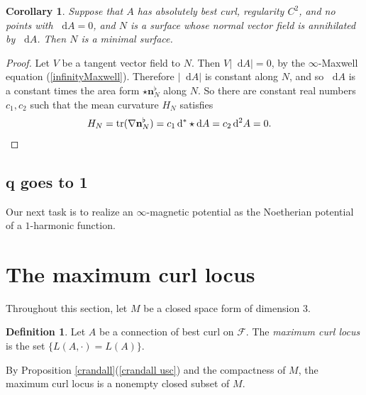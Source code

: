 \documentclass[reqno,11pt]{amsart}
\newcommand*\dif{\mathop{}\!\mathrm{d}}
\DeclareMathOperator{\tr}{tr}
\newcommand{\normal}{\mathbf n}
\newcommand{\dfn}[1]{\emph{#1}\index{#1}}
\newtheorem{corollary}[theorem]{Corollary}
\theoremstyle{definition}
\newtheorem{definition}[theorem]{Definition}
\numberwithin{equation}{section}
\begin{document}
\begin{corollary}
Suppose that $A$ has absolutely best curl, regularity $C^2$, and no points with $\dif A = 0$, and $N$ is a surface whose normal vector field is annihilated by $\dif A$.
Then $N$ is a minimal surface.
\end{corollary}
\begin{proof}
Let $V$ be a tangent vector field to $N$. Then $V|\dif A| = 0$, by the $\infty$-Maxwell equation (\ref{infinityMaxwell}).
Therefore $|\dif A|$ is constant along $N$, and so $\dif A$ is a constant times the area form $\star \normal_N^\flat$ along $N$.
So there are constant real numbers $c_1, c_2$ such that the mean curvature $H_N$ satisfies
\begin{align*}
H_N &= \tr(\nabla \normal_N^\flat) = c_1 \dif^* \star \dif A = c_2 \dif^2 A = 0. \qedhere
\end{align*}
\end{proof}


\subsection{q goes to 1}
Our next task is to realize an $\infty$-magnetic potential as the Noetherian potential of a $1$-harmonic function.



\section{The maximum curl locus}
Throughout this section, let $M$ be a closed space form of dimension $3$.

\begin{definition}
Let $A$ be a connection of best curl on $\mathscr F$.
The \dfn{maximum curl locus} is the set $\{L(A, \cdot) = L(A)\}$.
\end{definition}

By Proposition \ref{crandall}(\ref{crandall usc}) and the compactness of $M$, the maximum curl locus is a nonempty closed subset of $M$.

\end{document}
